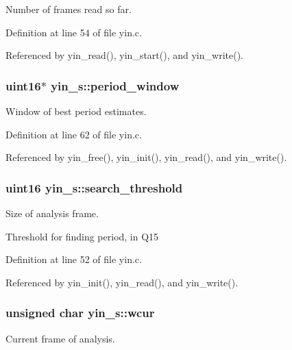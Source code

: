 Number of frames read so far. 



Definition at line 54 of file yin.\-c.



Referenced by yin\-\_\-read(), yin\-\_\-start(), and yin\-\_\-write().

\subsubsection[{period\-\_\-window}]{\setlength{\rightskip}{0pt plus 5cm}uint16$\ast$ yin\-\_\-s\-::period\-\_\-window}\label{structyin__s_a1928cec127e250f6cd15249085bc9fc8}


Window of best period estimates. 



Definition at line 62 of file yin.\-c.



Referenced by yin\-\_\-free(), yin\-\_\-init(), yin\-\_\-read(), and yin\-\_\-write().

\subsubsection[{search\-\_\-threshold}]{\setlength{\rightskip}{0pt plus 5cm}uint16 yin\-\_\-s\-::search\-\_\-threshold}\label{structyin__s_a8cca938167af6b504458ff9578420afd}


Size of analysis frame. 

Threshold for finding period, in Q15 

Definition at line 52 of file yin.\-c.



Referenced by yin\-\_\-init(), yin\-\_\-read(), and yin\-\_\-write().

\subsubsection[{wcur}]{\setlength{\rightskip}{0pt plus 5cm}unsigned char yin\-\_\-s\-::wcur}\label{structyin__s_ab79376deb3761d5d3ae72f727ac25660}


Current frame of analysis. 



